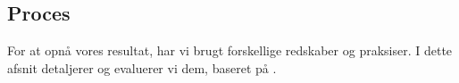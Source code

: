 \subsection{Proces}
For at opnå vores resultat, har vi brugt forskellige redskaber og praksiser.
I dette afsnit detaljerer og evaluerer vi dem, baseret på \citet{book:softwareinnovation}.